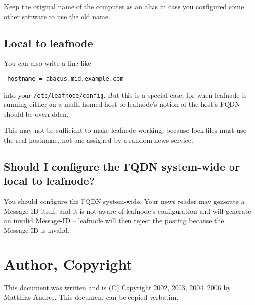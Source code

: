 \documentclass[10pt,english,a5paper]{article}
\begin{document}
Keep the original name of the computer as an alias in case you
configured some other software to use the old name.

\subsection{Local to leafnode}

You can also write a line like

\begin{verbatim}
 hostname = abacus.mid.example.com
\end{verbatim}

into your \texttt{/etc/leafnode/config}. But this is a special case, for
when leafnode is running either on a multi-homed host or leafnode's
notion of the host's FQDN should be overridden. 

This may not be sufficient to make leafnode working, because lock files
must use the real hostname, not one assigned by a random news service.

\subsection{Should I configure the FQDN system-wide or local to
leafnode?}

You should configure the FQDN system-wide. Your news reader may generate
a Message-ID itself, and it is not aware of leafnode's configuration and
will generate an invalid Message-ID -- leafnode will then reject the
posting because the Message-ID is invalid.

\section{Author, Copyright}

This document was written and is (C) Copyright 2002, 2003, 2004, 2006
by Matthias Andree. This document can be copied verbatim.
\end{document}
